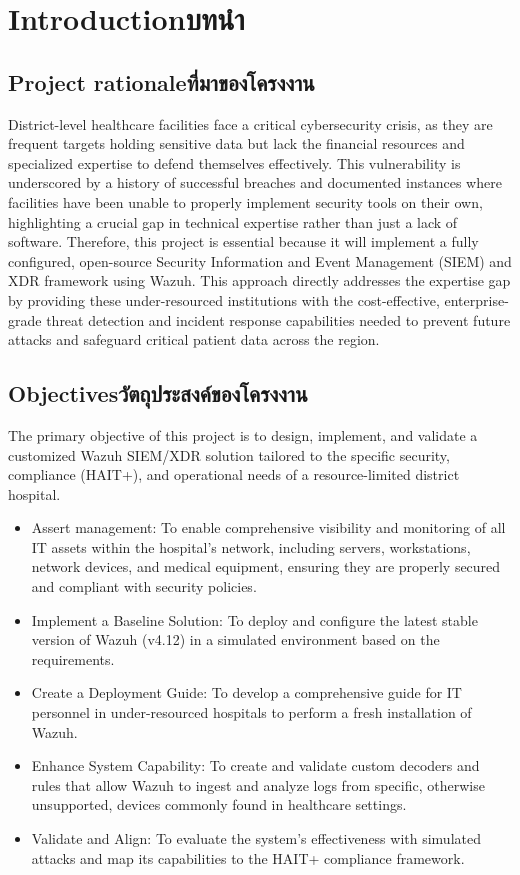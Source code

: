 \chapter{\ifenglish Introduction\else บทนำ\fi}

\section{\ifenglish Project rationale\else ที่มาของโครงงาน\fi}
    District-level healthcare facilities face a critical cybersecurity crisis, as they are frequent targets holding sensitive data but lack the financial resources and specialized expertise to defend themselves effectively. This vulnerability is underscored by a history of successful breaches and documented instances where facilities have been unable to properly implement security tools on their own, highlighting a crucial gap in technical expertise rather than just a lack of software. Therefore, this project is essential because it will implement a fully configured, open-source Security Information and Event Management (SIEM) and XDR framework using Wazuh. This approach directly addresses the expertise gap by providing these under-resourced institutions with the cost-effective, enterprise-grade threat detection and incident response capabilities needed to prevent future attacks and safeguard critical patient data across the region.

\section{\ifenglish Objectives\else วัตถุประสงค์ของโครงงาน\fi}
    The primary objective of this project is to design, implement, and validate a customized Wazuh SIEM/XDR solution tailored to the specific security, compliance (HAIT+), and operational needs of a resource-limited district hospital.
\begin{itemize}

    \item {Assert management: To enable comprehensive visibility and monitoring of all IT assets within the hospital's network, including servers, workstations, network devices, and medical equipment, ensuring they are properly secured and compliant with security policies.}
    \item {Implement a Baseline Solution: To deploy and configure the latest stable version of Wazuh (v4.12) in a simulated environment based on the requirements.}
    \item {Create a Deployment Guide: To develop a comprehensive guide for IT personnel in under-resourced hospitals to perform a fresh installation of Wazuh.}
    \item {Enhance System Capability: To create and validate custom decoders and rules that allow Wazuh to ingest and analyze logs from specific, otherwise unsupported, devices commonly found in healthcare settings.}
    \item {Validate and Align: To evaluate the system's effectiveness with simulated attacks and map its capabilities to the HAIT+ compliance framework.}
    
\end{itemize}

